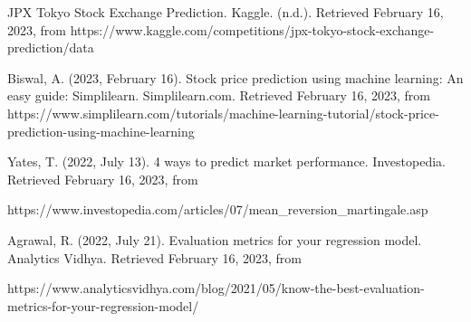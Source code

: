 \documentclass{article}
\begin{document}
\cite{CHONG2017187}

\cite{JIANG2021115537}

\cite{8541310}

\cite{arXiv:1605.00003}

\cite{JPX} 
JPX Tokyo Stock Exchange Prediction. Kaggle. (n.d.). Retrieved February 16, 2023, from https://www.kaggle.com/competitions/jpx-tokyo-stock-exchange-prediction/data 

\cite{Biswal} 
Biswal, A. (2023, February 16). Stock price prediction using machine learning: An easy guide: Simplilearn. Simplilearn.com. Retrieved February 16, 2023, from https://www.simplilearn.com/tutorials/machine-learning-tutorial/stock-price-prediction-using-machine-learning 

\cite{Yates} 
Yates, T. (2022, July 13). 4 ways to predict market performance. Investopedia. Retrieved February 16, 2023, from 

https://www.investopedia.com/articles/07/mean_reversion_martingale.asp 

\cite{Agrawal} 
Agrawal, R. (2022, July 21). Evaluation metrics for your regression model. Analytics Vidhya. Retrieved February 16, 2023, from 

https://www.analyticsvidhya.com/blog/2021/05/know-the-best-evaluation-metrics-for-your-regression-model/ 
\end{document}
